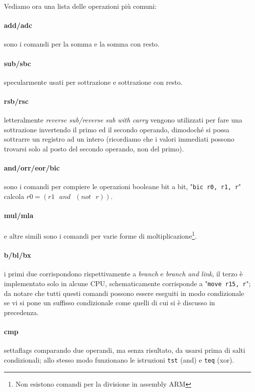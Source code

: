 \documentclass[class=book, crop=false]{standalone}
\begin{document}
Vediamo ora una lista delle operazioni più comuni:
\paragraph*{add/adc} sono i comandi per la somma e la somma con resto.
\paragraph{sub/sbc} specularmente usati per sottrazione e sottrazione con resto.
\paragraph*{rsb/rsc} letteralmente \emph{reverse sub/reverse sub with carry} vengono utilizzati per fare una sottrazione invertendo il primo ed il secondo operando, dimodoché si possa sottrarre un registro ad un intero (ricordiamo che i valori immediati possono trovarsi solo al posto del secondo operando, non del primo).
\paragraph*{and/orr/eor/bic} sono i comandi per compiere le operazioni booleane bit a bit, "\texttt{bic r0, r1, r}" calcola $r0=(r1\text{ }and\text{ }(not\text{ }r))$.
\paragraph*{mul/mla} e altre simili sono i comandi per varie forme di moltiplicazione\footnote{Non esistono comandi per la divisione in assembly ARM}.
\paragraph*{b/bl/bx} i primi due corrispondono rispettivamente a \emph{branch} e \emph{branch and link}, il terzo è implementato solo in alcune CPU, schematicamente corrisponde a  "\texttt{move r15, r}"; da notare che tutti questi comandi possono essere eseguiti in modo condizionale se vi si pone un suffisso condizionale come quelli di cui si è discusso in precedenza.
\paragraph*{cmp} settaflags comparando due operandi, ma senza risultato, da usarsi prima di salti condizionali; allo stesso modo funzionano le istruzioni \texttt{tst} (and) e \texttt{teq} (xor).
\end{document}
